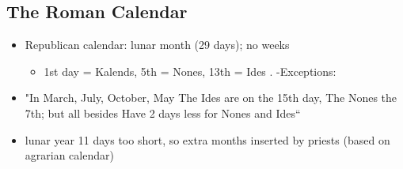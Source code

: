 \documentclass[12pt, twoside]{article}
\begin{document}
\subsection{The Roman Calendar}
\begin{itemize}
\item Republican calendar: lunar month (29 days); no weeks
	\begin{itemize}
	\item 1st day = Kalends, 5th = Nones, 13th = Ides . -Exceptions:
	\end{itemize}
\item "In March, July, October, May The Ides are on the 15th day,	The Nones the 7th; but all besides Have 2 days less for Nones and Ides“
\item lunar year 11 days too short, so extra months inserted by priests (based on agrarian calendar)
\end{itemize}
\end{document}
